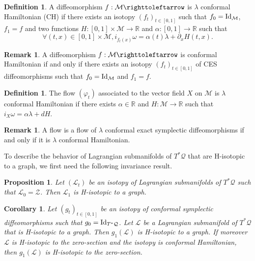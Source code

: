 \documentclass[JEP,XML,SOM,Unicode,published]{cedram}
\newtheorem{corollary}{Corollary}
\newtheorem{proposition}{Proposition}
\theoremstyle{definition}
\newtheorem{remark}[theorem]{Remark}
\newtheorem{definition}[theorem]{Definition}
\def\R{\mathbb{R}}
\def\cL{{\mathcal L}}
\def\cM{{\mathcal M}}
\def\cQ{{\mathcal Q}}
\def\cZ{{\mathcal Z}}
\begin{document}
\begin{definition}
A diffeomorphism $f: \cM \righttoleftarrow$ is $\lambda$ conformal Hamiltonian (CH) if there exists an isotopy $(f_t)_{t\in[0, 1]}$ such that $f_0={\rm Id}_\cM$, $f_1=f$ and two functions $H:[0, 1]\times \cM\to \R$ and $\alpha:[0, 1]\to \R$ such that
\[
\forall (t, x)\in [0, 1]\times \cM, i_{\dot f_t(x)}\omega=\alpha(t)\lambda+\partial_xH(t, x).
\]
\end{definition}

\begin{remark}
A diffeomorphism $f: \cM \righttoleftarrow$ is conformal Hamiltonian if and only if there exists an isotopy $(f_t)_{t\in[0, 1]}$ of CES diffeomorphisms such that $f_0={\rm Id}_\cM$ and $f_1=f$.
\end{remark}

\begin{definition}
The flow $(\varphi_t)$ associated to the vector field $X$ on $\cM$ is $\lambda$ conformal Hamiltonian if there exists $\alpha\in \R$ and $H:\cM\to \R$ such that $i_X\omega=\alpha \lambda +dH$.
\end{definition}

\begin{remark}
A flow is a flow of $\lambda$ conformal exact symplectic diffeomorphisms if and only if it is $\lambda$ conformal Hamiltonian.
\end{remark}

To describe the behavior of Lagrangian submanifolds of $T^*\cQ$ that are H-isotopic to a graph, we first need the following invariance result.
\begin{proposition}
\label{Pisotopytograph}
Let $(\cL_t)$ be an isotopy of Lagrangian submanifolds of $T^*\cQ$ such that $\cL_0=\cZ$. Then $\cL_1$ is H-isotopic to a graph.
\end{proposition}

\begin{corollary}
\label{PHisotopytograph}
Let $(g_t)_{t\in[0, 1]}$ be an isotopy of conformal symplectic diffeomorphisms such that $g_0={\rm Id}_{T^*\cQ}$. Let $\cL$ be a Lagrangian submanifold of $T^*\cQ$ that is H-isotopic to a graph. Then $g_1(\cL)$ is H-isotopic to a graph. 
If moreover $\cL$ is H-isotopic to the zero-section and the isotopy is conformal Hamiltonian, then $g_1(\cL)$ is H-isotopic to the zero-section.
\end{corollary}
\end{document}
